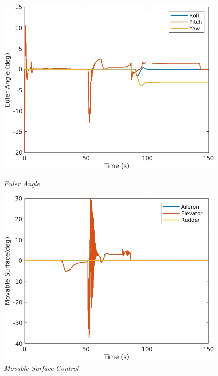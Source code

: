 \begin{figure}[htbp]
\begin{minipage}[b]{0.45\textwidth}
    \centering
    \includegraphics[width=\textwidth]{Images/TRANS/3 EulerAngle_1.jpg}
    \caption*{\textit{Euler Angle}}
  \end{minipage}
  \hfil
  \begin{minipage}[b]{0.45\textwidth}
    \centering
    \includegraphics[width=\textwidth]{Images/TRANS/4 MovableSurface_1.jpg}
    \caption*{\textit{Movable Surface Control}}
  \end{minipage}
  \begin{minipage}[b]{0.45\textwidth}
    \centering

\end{minipage}
\end{figure}
